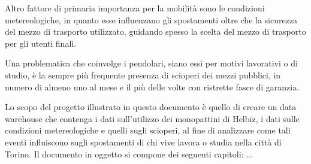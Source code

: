 Altro fattore di primaria importanza per la mobilità sono le condizioni metereologiche,
in quanto esse influenzano gli spostamenti oltre che la sicurezza del mezzo di
trasporto utilizzato, guidando spesso la scelta del mezzo di trasporto per gli utenti
finali. 

Una problematica che coinvolge i pendolari, siano essi per motivi lavorativi o di
studio, è la sempre più frequente presenza di scioperi dei mezzi pubblici, in numero
di almeno uno al mese e il più delle volte con ristrette fasce di garanzia.

Lo scopo del progetto illustrato in questo documento è quello di creare un data
warehouse che contenga i dati sull'utilizzo dei monopattini di Helbiz, i dati sulle
condizioni metereologiche e quelli sugli scioperi, al fine di analizzare come tali
eventi influiscono sugli spostamenti di chi vive lavora o studia nella città di Torino.
Il documento in oggetto si compone dei seguenti capitoli:
...

